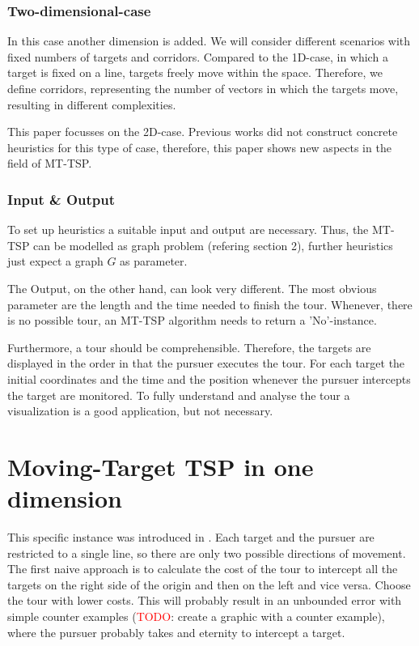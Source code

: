 \documentclass[english,version-2019-07]{uzl-thesis}
\begin{document}
\subsection{Two-dimensional-case}

In this case another dimension is added. We will consider different scenarios with fixed numbers of targets and corridors. Compared to the 1D-case, in which a target is fixed on a line, targets freely move within the space. Therefore, we define corridors, representing the number of vectors in which the targets move, resulting in different complexities.

This paper focusses on the 2D-case. Previous works did not construct concrete heuristics for this type of case, therefore, this paper shows new aspects in the field of MT-TSP.

\subsection{Input \& Output}
To set up heuristics a suitable input and output are necessary. Thus, the MT-TSP can be modelled as graph problem (refering section 2), further heuristics just expect a graph $G$ as parameter. 

The Output, on the other hand, can look very different. The most obvious parameter are the length and the time needed to finish the tour. Whenever, there is no possible tour, an MT-TSP algorithm needs to return a 'No'-instance. 

Furthermore, a tour should be comprehensible. Therefore, the targets are displayed in the order in that the pursuer executes the tour. For each target the initial coordinates and the time and the position whenever the pursuer intercepts the target are monitored. To fully understand and analyse the tour a visualization is a good application, but not necessary. 

\chapter{Moving-Target TSP in one dimension}%
\label{chapter-use}

This specific instance was introduced in \cite{helvig}. Each target and the pursuer are restricted to a single line, so there are only two possible directions of movement. The first naive approach is to calculate the cost of the tour to intercept all the targets on the right side of the origin and then on the left and vice versa. Choose the tour with lower costs. This will probably result in an unbounded error with simple counter examples (\textcolor{red}{TODO}: create a graphic with a counter example), where the pursuer probably takes and eternity to intercept a target.
\end{document}

